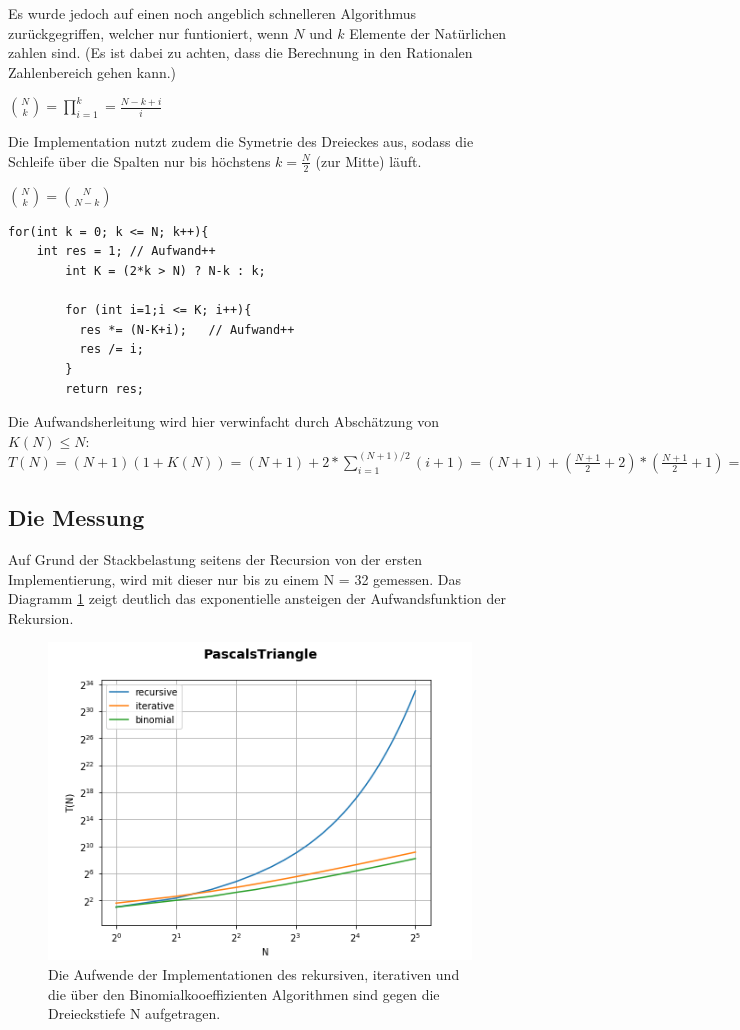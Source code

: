 \documentclass[
   draft=false
  ,paper=a4
  ,twoside=false
  ,fontsize=11pt
  ,headsepline
  ,DIV11
  ,parskip=full+
]{scrartcl} %
\begin{document}
Es wurde jedoch auf einen noch angeblich schnelleren Algorithmus zurückgegriffen, welcher nur funtioniert, wenn $N$ und $k$ Elemente der Natürlichen zahlen sind. (Es ist dabei zu achten, dass die Berechnung in den Rationalen Zahlenbereich gehen kann.)

$ \binom{N}{k} = \prod^k_{i=1}=\frac{N-k+i}{i}$

Die Implementation nutzt zudem die Symetrie des 
Dreieckes aus, sodass die Schleife über die Spalten nur bis höchstens $k = \frac{N}{2}$ (zur Mitte) läuft.

$ \binom{N}{k} = \binom{N}{N-k}$

\begin{lstlisting}
for(int k = 0; k <= N; k++){
	int res = 1; // Aufwand++
	    int K = (2*k > N) ? N-k : k;  

	    for (int i=1;i <= K; i++){
	      res *= (N-K+i);   // Aufwand++
	      res /= i;
	    }
	    return res;
\end{lstlisting}
Die Aufwandsherleitung wird hier verwinfacht durch Abschätzung von $ K(N) \leq N$:
$T(N) = (N+1)(1+K(N)) = (N+1) + 2*\sum^{(N+1)/2}_{i=1}(i+1) = (N+1) +(\frac{N+1}{2} +2)*(\frac{N+1}{2} +1) = \frac{N^2}{2} + \cdots  = \mathcal{O}(N^2)$

\flushleft
\subsection*{Die Messung}

Auf Grund der Stackbelastung seitens der Recursion von der ersten Implementierung, wird mit dieser nur bis zu einem N = 32 gemessen. Das Diagramm \ref{fig:recuriterfast} zeigt deutlich das exponentielle ansteigen der Aufwandsfunktion der Rekursion. 
	
\begin{figure}[htp]
	\label{fig:recuriterfast}
  	\centering
    \includegraphics[width=\textwidth]{./IMG/PascalsTriangle.png}
    \caption[recur iter fast]{Die Aufwende der Implementationen des rekursiven, iterativen und die über den Binomialkooeffizienten Algorithmen sind gegen die Dreieckstiefe N aufgetragen.}
\end{figure}
	
\end{document}
